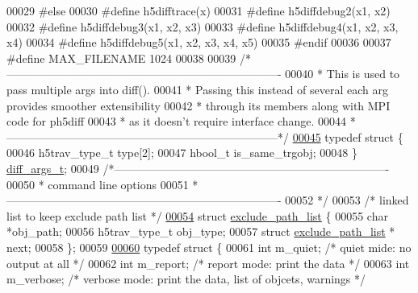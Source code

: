 \begin{DoxyCode}
00029 \textcolor{preprocessor}{#else}
00030 \textcolor{preprocessor}{#define h5difftrace(x)}
00031 \textcolor{preprocessor}{#define h5diffdebug2(x1, x2)}
00032 \textcolor{preprocessor}{#define h5diffdebug3(x1, x2, x3)}
00033 \textcolor{preprocessor}{#define h5diffdebug4(x1, x2, x3, x4)}
00034 \textcolor{preprocessor}{#define h5diffdebug5(x1, x2, x3, x4, x5)}
00035 \textcolor{preprocessor}{#endif}
00036 
00037 \textcolor{preprocessor}{#define MAX\_FILENAME 1024}
00038 
00039 \textcolor{comment}{/*-------------------------------------------------------------------------}
00040 \textcolor{comment}{ * This is used to pass multiple args into diff().}
00041 \textcolor{comment}{ * Passing this instead of several each arg provides smoother extensibility }
00042 \textcolor{comment}{ * through its members along with MPI code for ph5diff}
00043 \textcolor{comment}{ * as it doesn't require interface change.}
00044 \textcolor{comment}{ *------------------------------------------------------------------------*/}
\hyperlink{structdiff__args__t}{00045} \textcolor{keyword}{typedef} \textcolor{keyword}{struct }\{
00046     h5trav\_type\_t   type[2];
00047     hbool\_t is\_same\_trgobj;
00048 \} \hyperlink{structdiff__args__t}{diff\_args\_t};
00049 \textcolor{comment}{/*-------------------------------------------------------------------------}
00050 \textcolor{comment}{ * command line options}
00051 \textcolor{comment}{ *-------------------------------------------------------------------------}
00052 \textcolor{comment}{ */}
00053 \textcolor{comment}{/* linked list to keep exclude path list */}
\hyperlink{structexclude__path__list}{00054} \textcolor{keyword}{struct }\hyperlink{structexclude__path__list}{exclude\_path\_list} \{
00055     \textcolor{keywordtype}{char}  *obj\_path;
00056     h5trav\_type\_t obj\_type;
00057     \textcolor{keyword}{struct }\hyperlink{structexclude__path__list}{exclude\_path\_list} * next;
00058 \};
00059 
\hyperlink{structdiff__opt__t}{00060} \textcolor{keyword}{typedef} \textcolor{keyword}{struct }\{
00061     \textcolor{keywordtype}{int}      m\_quiet;               \textcolor{comment}{/* quiet mide: no output at all */}
00062     \textcolor{keywordtype}{int}      m\_report;              \textcolor{comment}{/* report mode: print the data */}
00063     \textcolor{keywordtype}{int}      m\_verbose;             \textcolor{comment}{/* verbose mode: print the data, list of objcets, warnings */}

\end{DoxyCode}
